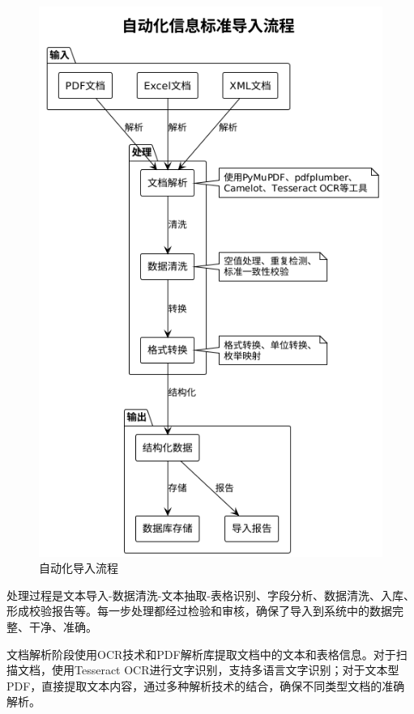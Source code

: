 \begin{figure}[H]
    \centering
    \includegraphics[height=0.5\textheight,keepaspectratio]{chapters/fig-0/import_pipeline_simple.png}
    \caption{自动化导入流程}
    \label{fig:import_pipeline}
\end{figure}

处理过程是文本导入-数据清洗-文本抽取-表格识别、字段分析、数据清洗、入库、形成校验报告等。每一步处理都经过检验和审核，确保了导入到系统中的数据完整、干净、准确。

文档解析阶段使用OCR技术和PDF解析库提取文档中的文本和表格信息。对于扫描文档，使用Tesseract OCR进行文字识别，支持多语言文字识别；对于文本型PDF，直接提取文本内容，通过多种解析技术的结合，确保不同类型文档的准确解析。

